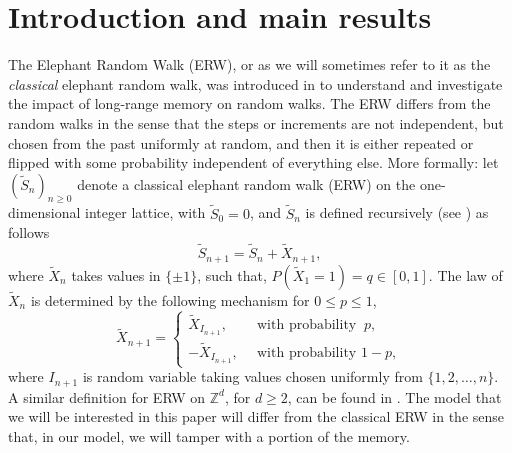 \documentclass{article}
\numberwithin{equation}{section}
\newcommand{\Z}{\mbox{${\mathbb Z}$}}
\newcommand{\1}{\mathbf{1}}
\newcommand{\0}{\mathbf{0}}
\begin{document}
\section{Introduction and main results}
\label{Sec:Intro}
The Elephant Random Walk (ERW), or as we will sometimes refer to it as the \textit{classical} elephant random walk, was introduced in \cite{Sc_Tr_2004} to understand and investigate the impact of long-range memory on random walks. The ERW differs from the random walks in the sense that the steps or increments are not independent, but chosen from the past uniformly at random, and then it is either repeated or flipped with some probability independent of everything else. More formally: 
let $\left(\tilde{S}_n\right)_{n \ge 0}$ denote a classical elephant random walk (ERW) on the one-dimensional integer lattice, with $\tilde{S}_0=0$, and $\tilde{S}_n$ is defined recursively (see \cite{Ba_Be_2016,Be_2018}) as follows
\begin{equation}
\label{Def: ERW}
\tilde{S}_{n+1}=\tilde{S}_n + \tilde{X}_{n+1},
\end{equation}
where $\tilde{X}_{n}$ takes values in $\{ \pm 1\}$, such that, $P(\tilde{X}_1 = 1)=q \in [0, 1]$. The law of $\tilde{X}_n$ is determined by the following mechanism  for $0 \le p \le 1$, 
\begin{equation}
\label{Eq:Choice_of_step-sizes}
\tilde{X}_{n+1}= \begin{cases}
           \tilde{X}_{I_{n+1}}, \, & \text{ with probability } \ p, \\
           -\tilde{X}_{I_{n+1}}, \, & \text{ with probability } 1-p,
\end{cases}
\end{equation}
where $I_{n+1}$ is random variable taking values chosen uniformly from $\{1,2,\ldots, n\}$. A similar definition for ERW on $\Z^d$, for $d \ge 2$, can be found in \cite{Be_La_2019a}. The model that we will be interested in this paper will differ from the classical ERW in the sense that, in our model, we will tamper with a portion of the memory. 
\end{document}
